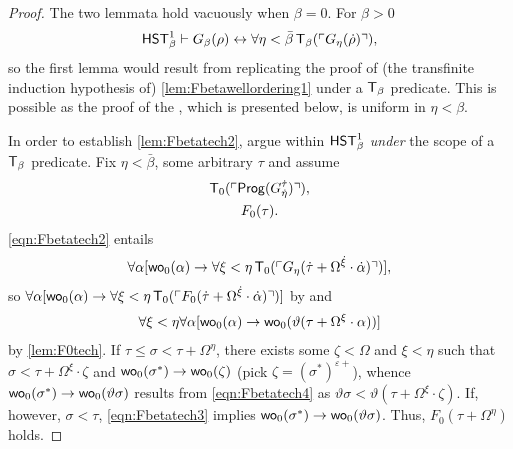 \documentclass[UKenglish,cleveref,DIV=12]{scrartcl}
\theoremstyle{definition}
\theoremstyle{definition}
\begin{document}
\begin{proof}
The two lemmata hold vacuously when $\beta=0$. For $\beta>0$
\begin{align*}
 \mathsf{HST}_\beta^1\vdash G_\beta(\rho)\leftrightarrow \forall\eta<\bar\beta\,\mathsf{T}_\beta(\ulcorner{G_\eta(\dot\rho)}\urcorner),
\end{align*}
so the first lemma would result from replicating the proof of (the transfinite
induction hypothesis of) \cref{lem:Fbetawellordering1} under a $\mathsf{T}_\beta$
predicate. This is possible as the proof of the , which is presented below, is
uniform in $\eta<\beta$.

In order to establish \cref{lem:Fbetatech2}, argue within $\mathsf{HST}_\beta^1$ \emph{under} the scope of a $\mathsf{T}_\beta$ predicate. Fix $\eta<\bar\beta$, some arbitrary $\tau$ and assume
\begin{gather}
  \mathsf{T}_0(\ulcorner{\mathsf{Prog}(G_{\dot \eta}^{\dot\tau})}\urcorner),\label{eqn:Fbetatech2}\\
  F_0(\tau).\label{eqn:Fbetatech3}
\end{gather}
\eqref{eqn:Fbetatech2} entails
\begin{gather*}
  \forall\alpha [\mathsf{wo}_0(\alpha)\rightarrow \forall\xi<\eta\,\mathsf{T}_0(\ulcorner{G_\eta(\dot\tau+\Omega^{\dot\xi}\cdot\dot\alpha)}\urcorner)],
\end{gather*}
so $\forall\alpha[\mathsf{wo}_0(\alpha)\rightarrow \forall\xi<\eta\,\mathsf{T}_0(\ulcorner{F_0(\dot\tau+\Omega^{\dot\xi}\cdot\dot\alpha)}\urcorner)]$ by  and
\begin{align}\label{eqn:Fbetatech4}
  \forall\xi<\eta\forall\alpha [\mathsf{wo}_0(\alpha)\rightarrow\mathsf{wo}_0(\vartheta(\tau+\Omega^\xi\cdot\alpha))]
\end{align}
by \cref{lem:F0tech}. If $\tau\le\sigma<\tau+\Omega^\eta$, there exists some
$\zeta<\Omega$ and $\xi<\eta$ such that $\sigma<\tau+\Omega^\xi\cdot\zeta$
and $\mathsf{wo}_0(\sigma^*)\rightarrow \mathsf{wo}_0(\zeta)$ (pick
$\zeta=(\sigma^*)^{\varepsilon+}$), whence $\mathsf{wo}_0(\sigma^*)\rightarrow
\mathsf{wo}_0(\vartheta\sigma)$ results from \eqref{eqn:Fbetatech4} as
$\vartheta\sigma<\vartheta(\tau+\Omega^\xi\cdot\zeta)$. If, however,
$\sigma<\tau$, \eqref{eqn:Fbetatech3} implies $\mathsf{wo}_0(\sigma^*)\rightarrow
\mathsf{wo}_0(\vartheta\sigma)$. Thus, $F_0(\tau+\Omega^\eta)$ holds.
\end{proof}
\end{document}
